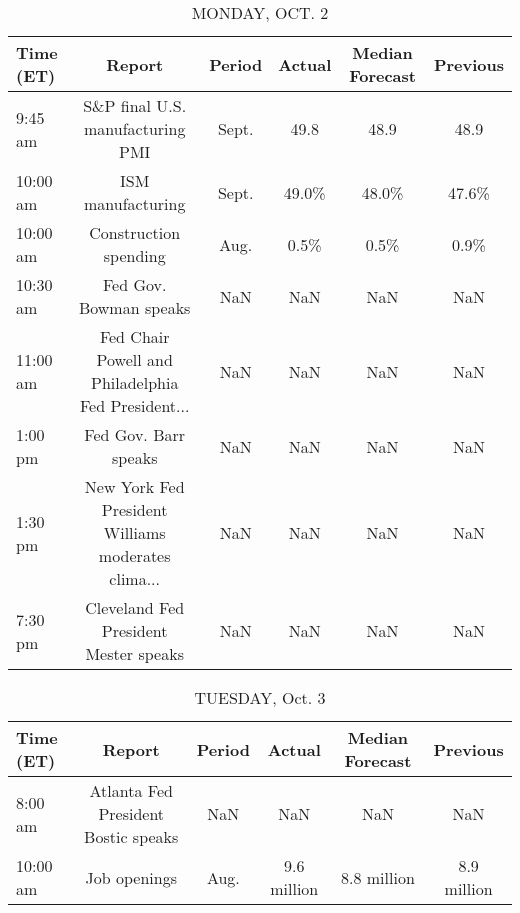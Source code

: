 \documentclass{article}%
\begin{document}
%
\normalsize%


\begin{table}[htbp]%
\caption{MONDAY, OCT. 2}%
\centering%
\begin{adjustbox}{width=1\textwidth}%
\begin{tabular}{lccccc}
\toprule
Time (ET) &                                             Report & Period & Actual & Median Forecast & Previous \\
\midrule
  9:45 am &                   S\&P final U.S. manufacturing PMI &  Sept. &   49.8 &            48.9 &     48.9 \\
 10:00 am &                                  ISM manufacturing &  Sept. &  49.0\% &           48.0\% &    47.6\% \\
 10:00 am &                              Construction spending &   Aug. &   0.5\% &            0.5\% &     0.9\% \\
 10:30 am &                             Fed Gov. Bowman speaks &    NaN &    NaN &             NaN &      NaN \\
 11:00 am & Fed Chair Powell and Philadelphia Fed President... &    NaN &    NaN &             NaN &      NaN \\
  1:00 pm &                               Fed Gov. Barr speaks &    NaN &    NaN &             NaN &      NaN \\
  1:30 pm & New York Fed President Williams moderates clima... &    NaN &    NaN &             NaN &      NaN \\
  7:30 pm &              Cleveland Fed President Mester speaks &    NaN &    NaN &             NaN &      NaN \\
\bottomrule
\end{tabular}
%
\end{adjustbox}%
\end{table}

%


\begin{table}[htbp]%
\caption{TUESDAY, Oct. 3}%
\centering%
\begin{adjustbox}{width=1\textwidth}%
\begin{tabular}{lccccc}
\toprule
Time (ET) &                              Report & Period &      Actual & Median Forecast &    Previous \\
\midrule
  8:00 am & Atlanta Fed President Bostic speaks &    NaN &         NaN &             NaN &         NaN \\
 10:00 am &                        Job openings &   Aug. & 9.6 million &     8.8 million & 8.9 million \\
\bottomrule
\end{tabular}
%
\end{adjustbox}%
\end{table}
\end{document}
